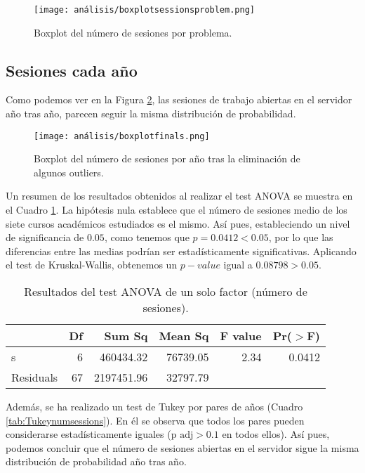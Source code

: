 \begin{figure}[H]
    \centering
    \texttt{[image: análisis/boxplotsessionsproblem.png]}
    \caption{Boxplot del número de sesiones por problema.}
    \label{fig:boxplotsessionsproblem}
\end{figure}

\subsection{Sesiones cada año}\label{sec:ANOVANumSessions}

Como podemos ver en la Figura \ref{fig:boxplotsessionsyear}, las sesiones de trabajo abiertas en el servidor año tras año, parecen seguir la misma distribución de probabilidad.

\begin{figure}[H]
    \centering
    \texttt{[image: análisis/boxplotfinals.png]}
    \caption{Boxplot del número de sesiones por año tras la eliminación de algunos outliers.}
    \label{fig:boxplotsessionsyear}
\end{figure}

Un resumen de los resultados obtenidos al realizar el test ANOVA se muestra en el Cuadro \ref{tab:ANOVAnumsessions}. La hipótesis nula establece que el número de sesiones medio de los siete cursos académicos estudiados es el mismo. Así pues, estableciendo un nivel de significancia de $0.05$, como tenemos que $p = 0.0412 < 0.05$, por lo que las diferencias entre las medias podrían ser estadísticamente significativas. Aplicando el test de Kruskal-Wallis, obtenemos un $p-value$ igual a $0.08798 > 0.05$.

\begin{table}[H]
\centering
\caption{Resultados del test ANOVA de un solo factor (número de sesiones).}
\label{tab:ANOVAnumsessions}
\begin{tabular}{lrrrrr}
  \hline
 & Df & Sum Sq & Mean Sq & F value & Pr($>$F) \\ 
  \hline
s & 6 & 460434.32 & 76739.05 & 2.34 & 0.0412 \\ 
  Residuals         & 67 & 2197451.96 & 32797.79 &  &  \\ 
   \hline
\end{tabular}
\end{table}

Además, se ha realizado un test de Tukey por pares de años (Cuadro \ref{tab:Tukeynumsessions}). En él se observa que todos los pares pueden considerarse estadísticamente iguales ($\text{p adj} > 0.1$ en todos ellos). Así pues, podemos concluir que el número de sesiones abiertas en el servidor sigue la misma distribución de probabilidad año tras año.

